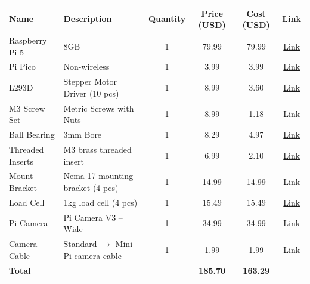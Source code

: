 \begin{tabular}{|l|l|c|c|c|c|}
    \hline
    \textbf{Name} & \textbf{Description} & \textbf{Quantity} & \textbf{Price (USD)} & \textbf{Cost (USD)} & \textbf{Link} \\ \hline
    Raspberry Pi 5 & 8GB & 1 & 79.99 & 79.99 & \href{https://www.microcenter.com/product/673711/raspberry-pi-5-8gb-lpddr4x}{Link} \\ \hline
    Pi Pico & Non-wireless & 1 & 3.99 & 3.99 & \href{https://www.microcenter.com/product/661033/raspberry-pi-pico-microcontroller-development-board}{Link} \\ \hline
    L293D & Stepper Motor Driver (10 pcs) & 1 & 8.99 & 3.60 & \href{https://www.amazon.com/gp/product/B09NBQYVLL/ref=ppx_yo_dt_b_asin_title_o00_s00}{Link} \\ \hline
    M3 Screw Set & Metric Screws with Nuts & 1 & 8.99 & 1.18 & \href{https://www.amazon.com/dp/B0BMQFHD8H?ref_=yo_ov_dt_b_fed_asin_title}{Link} \\ \hline
    Ball Bearing & 3mm Bore & 1 & 8.29 & 4.97 & \href{https://www.amazon.com/dp/B07WF18HQY?ref_=ppx_yo2ov_dt_b_fed_asin_title}{Link} \\ \hline
    Threaded Inserts & M3 brass threaded insert & 1 & 6.99 & 2.10 & \href{https://www.amazon.com/dp/B0CCX33LHD?ref_=ppx_yo2ov_dt_b_fed_asin_title}{Link} \\ \hline
    Mount Bracket & Nema 17 mounting bracket (4 pcs) & 1 & 14.99 & 14.99 & \href{https://www.amazon.com/dp/B07JW6X9ZR?ref_=ppx_yo2ov_dt_b_fed_asin_title}{Link} \\ \hline
    Load Cell & 1kg load cell (4 pcs) & 1 & 15.49 & 15.49 & \href{https://www.amazon.com/dp/B09YTQKQ9G/ref=ppx_yo_dt_b_search_asin_title}{Link} \\ \hline
    Pi Camera & Pi Camera V3 – Wide & 1 & 34.99 & 34.99 & \href{https://www.microcenter.com/product/662018/raspberry-pi-camera-3-wide}{Link} \\ \hline
    Camera Cable & Standard $\rightarrow$ Mini Pi camera cable & 1 & 1.99 & 1.99 & \href{https://www.microcenter.com/product/671933/raspberry-pi-5-camera-cable-300mm}{Link} \\ \hline
    \textbf{Total} &  &  & \textbf{185.70} & \textbf{163.29} &  \\ \hline
\end{tabular}


